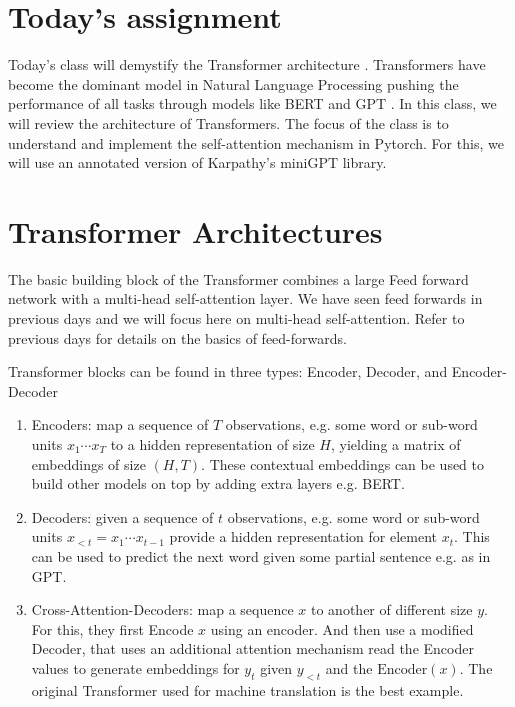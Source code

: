 \section{Today's assignment}
Today's class will demystify the Transformer architecture \cite{vaswani2017attention}. Transformers have become the dominant model in Natural Language Processing pushing the performance of all tasks through models like BERT \cite{devlin2018bert} and GPT \cite{brown2020language}. In this class, we will review the architecture of Transformers. The focus of the class is to understand and implement the self-attention mechanism in Pytorch. For this, we will use an annotated version of Karpathy's miniGPT library.


\section{Transformer Architectures}

The basic building block of the Transformer combines a large Feed forward network with a multi-head self-attention layer. We have seen feed forwards in previous days and we will focus here on multi-head self-attention. Refer to previous days for details on the basics of feed-forwards.

Transformer blocks can be found in three types: Encoder, Decoder, and Encoder-Decoder 

\begin{enumerate}
\item Encoders: map a sequence of $T$ observations, e.g. some word or sub-word units $x_1 \cdots x_T$ to a hidden representation of size $H$, yielding a matrix of embeddings of size $(H, T)$. These contextual embeddings can be used to build other models on top by adding extra layers e.g. BERT.
\item Decoders: given a sequence of $t$ observations, e.g. some word or sub-word units $x_{<t} = x_1 \cdots x_{t-1}$ provide a hidden representation for element $x_t$. This can be used to predict the next word given some partial sentence e.g. as in GPT. 
\item Cross-Attention-Decoders: map a sequence $x$ to another of different size $y$. For this, they first Encode $x$ using an encoder. And then use a modified Decoder, that uses an additional attention mechanism read the Encoder values to generate embeddings for $y_t$ given $y_{<t}$ and the $\mathrm{Encoder}(x)$. The original Transformer used for machine translation is the best example.
\end{enumerate}

